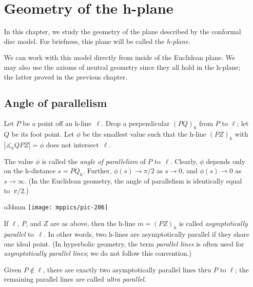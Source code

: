 \chapter{Geometry of the h-plane}\label{chap:h-plane}

In this chapter, we study the geometry of the plane described by the conformal disc model.
For briefness, this plane will be called the {}\emph{h-plane}.

We can work with this model directly from inside of the Euclidean plane. 
We may also use the axioms of neutral geometry since they all hold in the h-plane; the latter proved in the previous chapter.

\section*{Angle of parallelism}

Let $P$ be a point off an h-line~$\ell$. 
Drop a perpendicular $(PQ)_h$ from $P$ to $\ell$;
let $Q$ be its foot point.
Let $\phi$ be the smallest value such that the h-line $(PZ)_h$ with $|\measuredangle_h Q P Z|=\phi$ does not intersect~$\ell$.

The value $\phi$ is called the \emph{angle of parallelism} of $P$ to~$\ell$.
Clearly, $\phi$ depends only on the h-distance $s=PQ_h$.
Further, $\phi(s)\to \pi/2$ as $s\to 0$, 
and $\phi(s)\to0$ as $s\to\infty$.
(In the Euclidean geometry, the angle of parallelism is identically equal to~$\pi/2$.)

\begin{wrapfigure}{o}{34mm}
\vskip-6mm
\centering
\texttt{[image: mppics/pic-206]}
\end{wrapfigure}

If $\ell$, $P$, and $Z$ are as above, then the h-line $m=(PZ)_h$ is called \emph{asymptotically parallel} to~$\ell$.
In other words, two h-lines are asymptotically parallel if they share one ideal point.
(In hyperbolic geometry, the term {}\emph{parallel lines} is often used for \emph{asymptotically parallel lines}; we do not follow this convention.)

Given $P\not\in\ell$, there are exactly two asymptotically parallel lines thru $P$ to $\ell$; 
the remaining parallel lines are called \emph{ultra parallel}.


